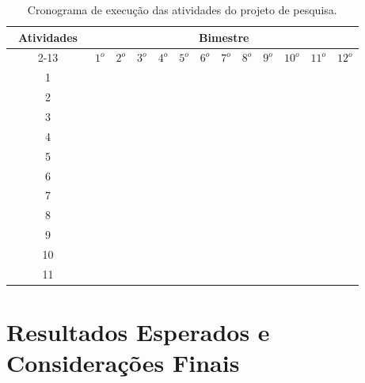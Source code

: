 \begin{table}[h!]
\begin{center}
\caption{Cronograma de execução das atividades do projeto de pesquisa.}
\label{tab:cronograma}
\setlength{\tabcolsep}{0pt}

\begin{tabular}{|c|l|l|l|l|l|l|l|l|l|l|l|l|}
\hline\hline
\multicolumn{1}{|c|}{~\textbf{Atividades}~} & \multicolumn{12}{c|}{\textbf{Bimestre}}\\ 
\cline{2-13}
\multicolumn{1}{|c|}{} &
\multicolumn{1}{c|}{$1^{o}$} &
\multicolumn{1}{c|}{$2^{o}$} &
\multicolumn{1}{c|}{$3^{o}$} &
\multicolumn{1}{c|}{$4^{o}$} &
\multicolumn{1}{c|}{$5^{o}$} &
\multicolumn{1}{c|}{$6^{o}$} &
\multicolumn{1}{c|}{$7^{o}$} &
\multicolumn{1}{c|}{$8^{o}$} &
\multicolumn{1}{c|}{$9^{o}$} &
\multicolumn{1}{c|}{$10^{o}$} &
\multicolumn{1}{c|}{$11^{o}$} &
\multicolumn{1}{c|}{$12^{o}$}
\\\hline\hline
1 & \p & \p & \p & \p & \p & \p & \p & \p & \p & \p & \p & \p\\\hline
2 & \p & \p & \p & \p & \p & \p & & & & & &\\\hline 
3 & & & \p & \p & & & & & & & &\\\hline 
4 & & & & \p & \p & & & & & & &\\\hline 
5 & & & & & & \p & & & & & &\\\hline
6 & & & & & & & \p & \p & & & &\\\hline
7 & & & & & & & \p & \p & & & &\\\hline
8 & & & & & & & & \p & \p & & &\\\hline
9 & & & & & & & & & \p & \p & &\\\hline
10 & & & & \p & \p & \p & \p & \p & \p & \p & \p &\\\hline
11 & & & \p & \p & \p & \p & \p & \p & \p & \p & \p & \p \\\hline
\end{tabular}
\end{center}
\end{table}

\section{Resultados Esperados e Considerações Finais}

